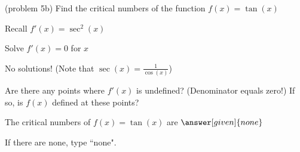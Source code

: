\documentclass{ximera}
\begin{document}
\begin{problem}(problem 5b)
  Find the critical numbers of the function $f(x) = \tan(x)$
  
  
    \begin{hint}
      Recall $f'(x) = \sec^2(x)$
    \end{hint}
		\begin{hint}
      Solve $f'(x) = 0$ for $x$
    \end{hint}
		\begin{hint}
      No solutions! (Note that $\sec(x) = \frac{1}{\cos(x)}$)
    \end{hint}
    \begin{hint}
      Are there any points where $f'(x)$ is undefined? (Denominator equals zero!)
      If so, is $f(x)$ defined at these points?  
		\end{hint}
    
    
		The critical numbers of $f(x) = \tan(x)$ are
		 $\answer[given]{none}$
		
		If there are none, type ``none".
		
\end{problem}



\begin{center}
\begin{foldable}
\end{foldable}
\end{center}
\end{document}
